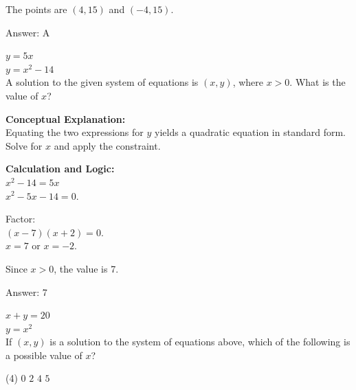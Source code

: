 \documentclass[11pt,paper=a4,answers]{exam}
\begin{document}
\begin{questions}
\begin{solution}
\vspace{10pt}

The points are $(4, 15)$ and $(-4, 15)$.

\vspace{25pt}

Answer: \colorbox{yellow!100}{A}
\end{solution}

\vspace{40pt}

\question
$y = 5x$ \\
$y = x^2 - 14$ \\
A solution to the given system of equations is $(x, y)$, where $x > 0$. What is the value of $x$?

\begin{solution}
\textbf{Conceptual Explanation:} \\
Equating the two expressions for $y$ yields a quadratic equation in standard form. Solve for $x$ and apply the constraint.

\vspace{20pt}

\textbf{Calculation and Logic:} \\
$x^2 - 14 = 5x$ \\
$x^2 - 5x - 14 = 0$.

\vspace{10pt}

Factor: \\
$(x - 7)(x + 2) = 0$. \\
$x = 7$ or $x = -2$.

\vspace{10pt}

Since $x > 0$, the value is 7.

\vspace{25pt}

Answer: \colorbox{yellow!100}{7}
\end{solution}

\vspace{40pt}

\question
$x + y = 20$ \\
$y = x^2$ \\
If $(x, y)$ is a solution to the system of equations above, which of the following is a possible value of $x$?
\begin{tasks}(4)
    \task $0$
    \task $2$
    \task $4$
    \task $5$
\end{tasks}


\end{questions}
\end{document}
